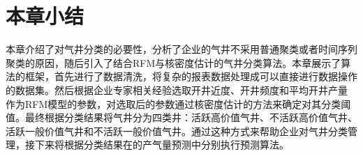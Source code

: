 \section{本章小结}
本章介绍了对气井分类的必要性，分析了企业的气井不采用普通聚类或者时间序列聚类的原因，随后引入了结合RFM与核密度估计的气井分类算法。本章展示了算法的框架，首先进行了数据清洗，将复杂的报表数据处理成可以直接进行数据操作的数据集。然后根据企业专家相关经验选取开井近度、开井频度和平均开井产量
作为RFM模型的参数，对选取后的参数通过核密度估计的方法来确定对其分类阈值。最终根据分类结果将气井分为四类井：活跃高价值气井、不活跃高价值气井、活跃一般价值气井和不活跃一般价值气井。通过这种方式来帮助企业对气井分类管理，接下来将根据分类结果在的产气量预测中分别执行预测算法。
    
